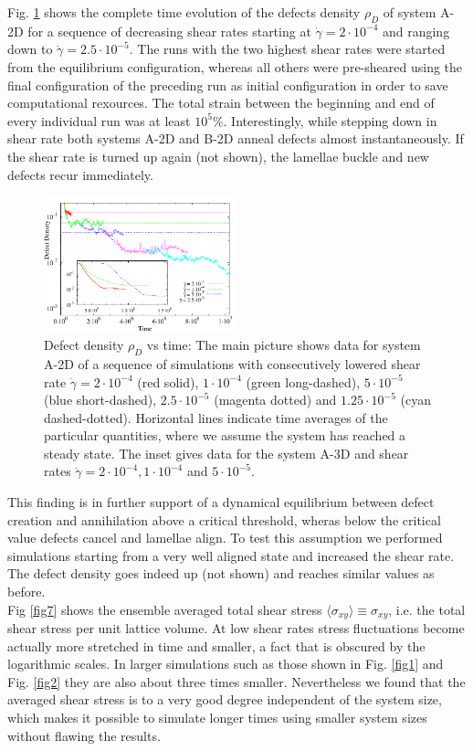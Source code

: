 \documentclass[8.5pt,twoside,twocolumn]{article}
\newcommand{\e}[1]{\cdot10^{#1}}
\newcommand{\gd}{\dot{\gamma}}
\begin{document}
Fig. \ref{fig6} shows the  complete time evolution of the defects density $\rho_D$ of system A-2D for a sequence of decreasing shear rates starting at $\gd=2\e{-4}$ and ranging down to $\gd=2.5\e{-5}$.
The runs with the two highest shear rates were started from the equilibrium configuration, whereas all others were pre-sheared using the final configuration of the preceding run as initial configuration in order to save computational rexources.
The total strain between the beginning and end of every individual run was at least $10^{5}\%$.
Interestingly, while stepping down in shear rate both systems A-2D and B-2D anneal defects almost instantaneously.
If the shear rate is turned up again (not shown), the lamellae buckle and new defects recur immediately.

\begin{figure}[htp]
\centering
\includegraphics[angle=0,width=0.5\textwidth]{defect_density_5e-4.pdf}
\caption{Defect density $\rho_D$ vs time: The main picture shows data for system A-2D of a sequence of simulations with consecutively lowered shear rate $\dot{\gamma}=2\e{-4}$ (red solid), $1\e{-4}$ (green long-dashed),  $5\e{-5}$ (blue short-dashed),  $2.5\e{-5}$ (magenta dotted) and  $1.25\e{-5}$ (cyan dashed-dotted). Horizontal lines indicate time averages of the particular quantities, where we assume the system has reached a steady state. The inset gives data for the system A-3D and shear rates $\dot{\gamma}=2\cdot10^{-4}, 1\cdot10^{-4}$ and $5\cdot10^{-5}$.} 
\label{fig6}
\end{figure}

This finding is in further support of a dynamical equilibrium between defect creation and annihilation above a critical threshold, wheras below the critical value defects cancel and lamellae align.
To test this assumption we performed simulations starting from a very well aligned state and increased the shear rate.
The defect density goes indeed up (not shown) and reaches similar values as before.\\
Fig \ref{fig7} shows the ensemble averaged total shear stress $\langle \sigma_{xy}\rangle \equiv\sigma_{xy} $, i.e. the total shear stress per unit lattice volume.
At low shear rates stress fluctuations become actually more stretched in time and smaller, a fact that is obscured by the logarithmic scales.
In larger simulations such as those shown in Fig. \ref{fig1} and Fig. \ref{fig2} they are also about three times smaller.
Nevertheless we found that the averaged shear stress is to a very good degree independent of the system size, which makes it possible to simulate longer times using smaller system sizes without flawing the results.
\end{document}
